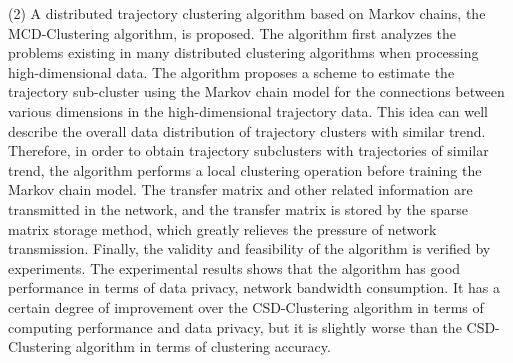 \begin{englishabstract}
(2) A distributed trajectory clustering algorithm based on Markov chains, the MCD-Clustering algorithm, is proposed. The algorithm first analyzes the problems existing in many distributed clustering algorithms when processing high-dimensional data. The algorithm proposes a scheme to estimate the trajectory sub-cluster using the Markov chain model for the connections between various dimensions in the high-dimensional trajectory data. This idea can well describe the overall data distribution of trajectory clusters with similar trend. Therefore, in order to obtain trajectory subclusters with trajectories of similar trend, the algorithm performs a local clustering operation before training the Markov chain model. The transfer matrix and other related information are transmitted in the network, and the transfer matrix is stored by the sparse matrix storage method, which greatly relieves the pressure of network transmission. Finally, the validity and feasibility of the algorithm is verified by experiments. The experimental results shows that the algorithm has good performance in terms of data privacy, network bandwidth consumption. It has a certain degree of improvement over the CSD-Clustering algorithm in terms of computing performance and data privacy, but it is slightly worse than the CSD-Clustering algorithm in terms of clustering accuracy.
	
\end{englishabstract}


